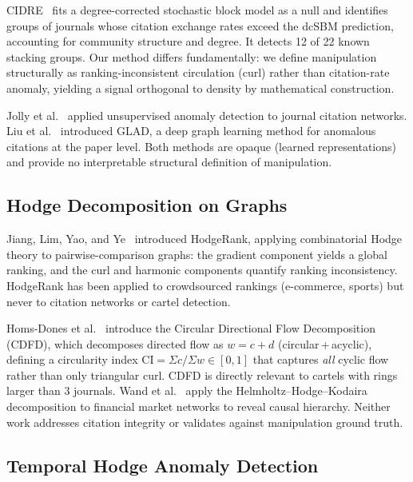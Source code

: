 \documentclass[twocolumn,11pt,letterpaper]{article}
\begin{document}
CIDRE~\cite{Kojaku2020} fits a degree-corrected stochastic block model as a
null and identifies groups of journals whose citation exchange rates exceed the
dcSBM prediction, accounting for community structure and degree. It detects 12
of 22 known stacking groups. Our method differs fundamentally: we define
manipulation structurally as ranking-inconsistent circulation (curl) rather
than citation-rate anomaly, yielding a signal orthogonal to density by
mathematical construction.

Jolly et al.~\cite{Jolly2020} applied unsupervised anomaly detection to
journal citation networks. Liu et al.~\cite{Liu2022} introduced GLAD, a deep
graph learning method for anomalous citations at the paper level. Both methods
are opaque (learned representations) and provide no interpretable structural
definition of manipulation.

\subsection{Hodge Decomposition on Graphs}

Jiang, Lim, Yao, and Ye~\cite{Jiang2008} introduced HodgeRank, applying
combinatorial Hodge theory to pairwise-comparison graphs: the gradient
component yields a global ranking, and the curl and harmonic components
quantify ranking inconsistency. HodgeRank has been applied to crowdsourced
rankings (e-commerce, sports) but never to citation networks or cartel
detection.

Homs-Dones et al.~\cite{HomsDones2025} introduce the Circular Directional
Flow Decomposition (CDFD), which decomposes directed flow as $w = c + d$
(circular\,+\,acyclic), defining a circularity index
$\mathrm{CI} = \Sigma c / \Sigma w \in [0,1]$ that captures \emph{all} cyclic
flow rather than only triangular curl. CDFD is directly relevant to cartels
with rings larger than 3 journals. Wand et al.~\cite{Wand2024} apply the
Helmholtz--Hodge--Kodaira decomposition to financial market networks to reveal
causal hierarchy. Neither work addresses citation integrity or validates
against manipulation ground truth.

\subsection{Temporal Hodge Anomaly Detection}
\end{document}
